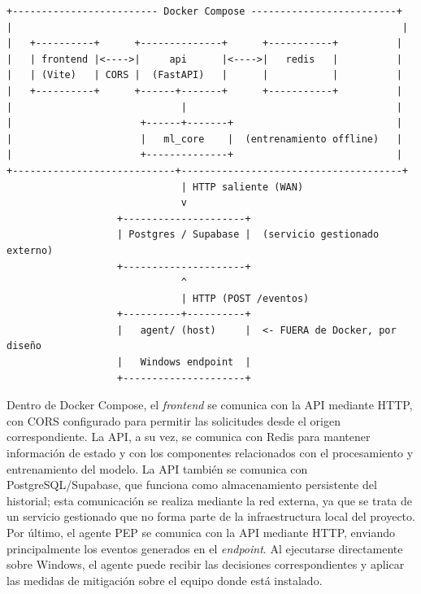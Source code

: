 \begin{verbatim}
+------------------------- Docker Compose -------------------------+
|                                                                   |
|   +----------+      +--------------+      +-----------+          |
|   | frontend |<---->|     api      |<---->|   redis   |          |
|   | (Vite)   | CORS |  (FastAPI)   |      |           |          |
|   +----------+      +------+-------+      +-----------+          |
|                             |                                    |
|                      +------+-------+                            |
|                      |   ml_core    |  (entrenamiento offline)   |
|                      +--------------+                            |
+----------------------------+--------------------------------------+
                              | HTTP saliente (WAN)
                              v
                   +---------------------+
                   | Postgres / Supabase |  (servicio gestionado externo)
                   +---------------------+
                              ^
                              | HTTP (POST /eventos)
                   +----------+----------+
                   |   agent/ (host)     |  <- FUERA de Docker, por diseño
                   |   Windows endpoint  |
                   +---------------------+
\end{verbatim}

Dentro de Docker Compose, el \emph{frontend} se comunica con la API mediante HTTP, con CORS configurado para permitir las solicitudes desde el origen correspondiente. La API, a su vez, se comunica con Redis para mantener información de estado y con los componentes relacionados con el procesamiento y entrenamiento del modelo. La API también se comunica con PostgreSQL/Supabase, que funciona como almacenamiento persistente del historial; esta comunicación se realiza mediante la red externa, ya que se trata de un servicio gestionado que no forma parte de la infraestructura local del proyecto. Por último, el agente PEP se comunica con la API mediante HTTP, enviando principalmente los eventos generados en el \emph{endpoint}. Al ejecutarse directamente sobre Windows, el agente puede recibir las decisiones correspondientes y aplicar las medidas de mitigación sobre el equipo donde está instalado.

